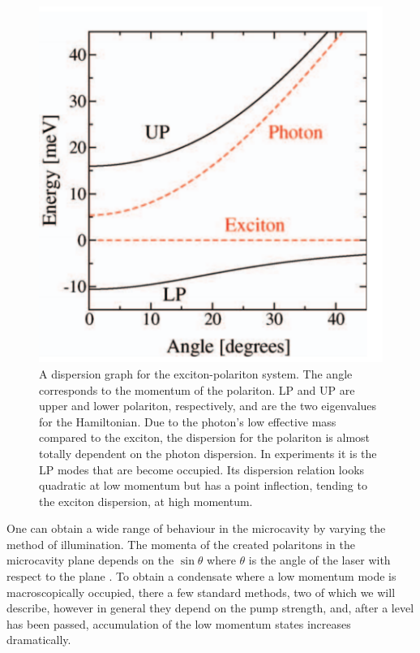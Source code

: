 \begin{figure}[htbp!]
	\centering
	\includegraphics[scale=0.4]{./Figures/polaritondispersion.pdf}
	\caption{A dispersion graph for the exciton-polariton system. The angle corresponds to the momentum of the polariton. LP and UP are upper and lower polariton, respectively, and are the two eigenvalues for the Hamiltonian. Due to the photon's low effective mass compared to the exciton, the dispersion for the polariton is almost totally dependent on the photon dispersion. In experiments it is the LP modes that are become occupied. Its dispersion relation looks quadratic at low momentum but has a point inflection, tending to the exciton dispersion, at high momentum. \cite{doi:10.1080/00107514.2010.550120}}
	\label{fig:polaritondispersion}
\end{figure}

One can obtain a wide range of behaviour in the microcavity by varying the method of illumination. 
The momenta of the created polaritons in the microcavity plane depends on the $\sin \theta$ where $\theta$ is the angle of the laser with respect to the plane \cite{doi:10.1080/00107514.2010.550120}. 
To obtain a condensate where a low momentum mode is macroscopically occupied, there a few standard methods, two of which we will describe, however in general they depend on the pump strength, and, after a level has been passed, accumulation of the low momentum states increases dramatically.

